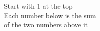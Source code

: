 \documentclass[preview]{standalone}
\begin{document}
Start with 1 at the top\\Each number below is the sum\\of the two numbers above it\\
\end{document}
